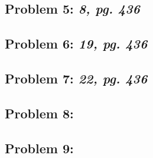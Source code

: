 \documentclass[a4paper]{article}
\begin{document}
\subsection*{Problem 5: \textit{8, pg. 436}} 

\subsection*{Problem 6: \textit{19, pg. 436}} 

\subsection*{Problem 7: \textit{22, pg. 436}} 

\subsection*{Problem 8:} 

\subsection*{Problem 9:} 
\end{document}
